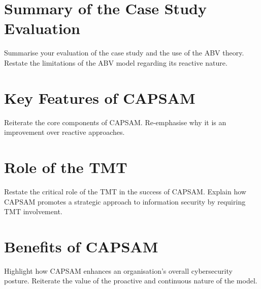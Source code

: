\section{Summary of the Case Study Evaluation}
Summarise your evaluation of the case study and the use of the ABV theory. Restate the limitations of the ABV model regarding its reactive nature.

\section{Key Features of CAPSAM}
Reiterate the core components of CAPSAM. Re-emphasise why it is an improvement over reactive approaches.

\section{Role of the TMT}
Restate the critical role of the TMT in the success of CAPSAM. Explain how CAPSAM promotes a strategic approach to information security by requiring TMT involvement.

\section{Benefits of CAPSAM}
Highlight how CAPSAM enhances an organisation's overall cybersecurity posture. Reiterate the value of the proactive and continuous nature of the model.